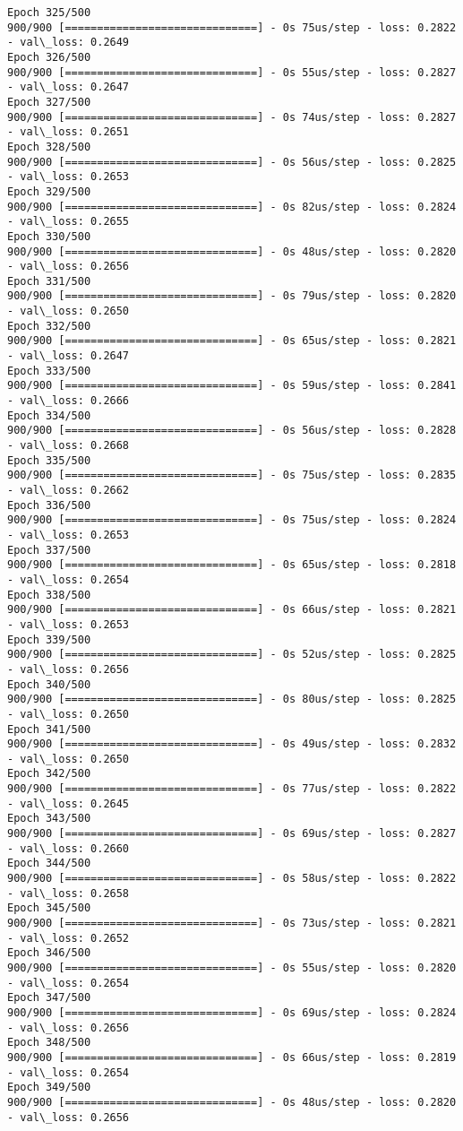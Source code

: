\documentclass[11pt]{article}
\begin{document}
\begin{Verbatim}[commandchars=\\\{\}]
Epoch 325/500
900/900 [==============================] - 0s 75us/step - loss: 0.2822 - val\_loss: 0.2649
Epoch 326/500
900/900 [==============================] - 0s 55us/step - loss: 0.2827 - val\_loss: 0.2647
Epoch 327/500
900/900 [==============================] - 0s 74us/step - loss: 0.2827 - val\_loss: 0.2651
Epoch 328/500
900/900 [==============================] - 0s 56us/step - loss: 0.2825 - val\_loss: 0.2653
Epoch 329/500
900/900 [==============================] - 0s 82us/step - loss: 0.2824 - val\_loss: 0.2655
Epoch 330/500
900/900 [==============================] - 0s 48us/step - loss: 0.2820 - val\_loss: 0.2656
Epoch 331/500
900/900 [==============================] - 0s 79us/step - loss: 0.2820 - val\_loss: 0.2650
Epoch 332/500
900/900 [==============================] - 0s 65us/step - loss: 0.2821 - val\_loss: 0.2647
Epoch 333/500
900/900 [==============================] - 0s 59us/step - loss: 0.2841 - val\_loss: 0.2666
Epoch 334/500
900/900 [==============================] - 0s 56us/step - loss: 0.2828 - val\_loss: 0.2668
Epoch 335/500
900/900 [==============================] - 0s 75us/step - loss: 0.2835 - val\_loss: 0.2662
Epoch 336/500
900/900 [==============================] - 0s 75us/step - loss: 0.2824 - val\_loss: 0.2653
Epoch 337/500
900/900 [==============================] - 0s 65us/step - loss: 0.2818 - val\_loss: 0.2654
Epoch 338/500
900/900 [==============================] - 0s 66us/step - loss: 0.2821 - val\_loss: 0.2653
Epoch 339/500
900/900 [==============================] - 0s 52us/step - loss: 0.2825 - val\_loss: 0.2656
Epoch 340/500
900/900 [==============================] - 0s 80us/step - loss: 0.2825 - val\_loss: 0.2650
Epoch 341/500
900/900 [==============================] - 0s 49us/step - loss: 0.2832 - val\_loss: 0.2650
Epoch 342/500
900/900 [==============================] - 0s 77us/step - loss: 0.2822 - val\_loss: 0.2645
Epoch 343/500
900/900 [==============================] - 0s 69us/step - loss: 0.2827 - val\_loss: 0.2660
Epoch 344/500
900/900 [==============================] - 0s 58us/step - loss: 0.2822 - val\_loss: 0.2658
Epoch 345/500
900/900 [==============================] - 0s 73us/step - loss: 0.2821 - val\_loss: 0.2652
Epoch 346/500
900/900 [==============================] - 0s 55us/step - loss: 0.2820 - val\_loss: 0.2654
Epoch 347/500
900/900 [==============================] - 0s 69us/step - loss: 0.2824 - val\_loss: 0.2656
Epoch 348/500
900/900 [==============================] - 0s 66us/step - loss: 0.2819 - val\_loss: 0.2654
Epoch 349/500
900/900 [==============================] - 0s 48us/step - loss: 0.2820 - val\_loss: 0.2656

\end{Verbatim}
\end{document}
